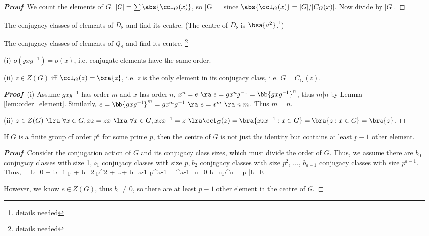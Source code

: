 \begin{proof}[\bf Proof]
We count the elements of $G$. $|G| = \sum \abs{\ccl_G(x)}$, so
\be
|G| = \sum {}
\ee
since $\abs{\ccl_G(x)} = |G|/|C_G(x)|$. Now divide by $|G|$.
\end{proof}


\begin{example}
The conjugacy classes of elements of $D_8$ and find its centre. (The centre of $D_8$ is $\bsa{a^2}$.\footnote{details needed})
\end{example}

\begin{example}
The conjugacy classes of elements of $Q_8$ and find its centre. \footnote{details needed}
\end{example}

\begin{proposition}\label{pro:conjugate_element}
\ben
\item [(i)] $o(gxg^{-1}) = o(x)$, i.e. conjugate elements have the same order.
\item [(ii)] $z\in Z(G)$ iff $\ccl_G(z)=\bra{z}$, i.e. $z$ is the only element in its conjugacy class, i.e. $G=C_G(z)$.
\een
\end{proposition}

\begin{proof}[\bf Proof]
\ben
\item [(i)] Assume $gxg^{-1}$ has order $m$ and $x$ has order $n$, $x^n = e \ \ra \ e = gx^n g^{-1} = \bb{gxg^{-1}}^n$, thus $m|n$ by Lemma \ref{lem:order_element}. Similarly, $e = \bb{gxg^{-1}}^m = gx^m g^{-1} \ \ra \ e = x^m \ \ra \ n|m$. Thus $m=n$.
\item [(ii)] $z\in Z(G) \ \lra \ \forall x\in G, xz = zx \ \lra \ \forall x\in G, xzx^{-1} = z \ \lra \ccl_G(z) = \bra{xzx^{-1}:x\in G} = \bra{z:x\in G} = \bra{z}$.
\een
\end{proof}



\begin{proposition}\label{pro:prime_center}
If $G$ is a finite group of order $p^a$ for some prime $p$, then the centre of $G$ is not just the identity but contains at least $p-1$ other element.
\end{proposition}
\begin{proof}[\bf Proof]
Consider the conjugation action of $G$ and its conjugacy class sizes, which must divide the order of $G$. Thus, we assume there are $b_0$ conjugacy classes with size 1, $b_1$ conjugacy classes with size $p$, $b_2$ conjugacy classes with size $p^2$, $\dots$, $b_{a-1}$ conjugacy classes with size $p^{a-1}$. Thus,
\be
{} = b_0  + b_1 \times p + b_2 \times p^2 + \dots + b_{a-1} \times p^{a-1} = \sum^{a-1}_{n=0} b_np^n \ \ra \ p |b_0.
\ee

However, we know $e\in Z(G)$, thus $b_0 \neq 0$, so there are at least $p-1$ other element in the centre of $G$.
\end{proof}

